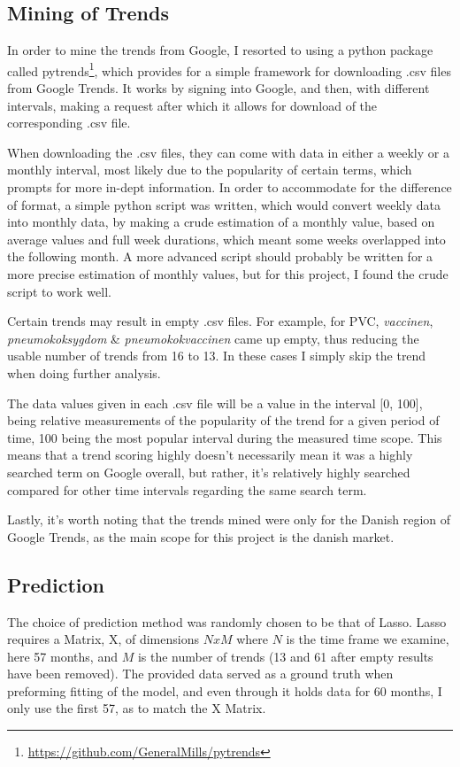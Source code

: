 \documentclass{sig-alternate}
\begin{document}
\subsection{Mining of Trends}
In order to mine the trends from Google, I resorted to using a python package called pytrends\footnote{\url{https://github.com/GeneralMills/pytrends}}, which provides for a simple framework for downloading .csv files from Google Trends. It works by signing into Google, and then, with different intervals, making a request after which it allows for download of the corresponding .csv file.

When downloading the .csv files, they can come with data in either a weekly or a monthly interval, most likely due to the popularity of certain terms, which prompts for more in-dept information. In order to accommodate for the difference of format, a simple python script was written, which would convert weekly data into monthly data, by making a crude estimation of a monthly value, based on average values and full week durations, which meant some weeks overlapped into the following month. A more advanced script should probably be written for a more precise estimation of monthly values, but for this project, I found the crude script to work well.

Certain trends may result in empty .csv files. For example, for PVC, \textit{vaccinen}, \textit{pneumokoksygdom} \& \textit{pneumokokvaccinen} came up empty, thus reducing the usable number of trends from 16 to 13. In these cases I simply skip the trend when doing further analysis.

The data values given in each .csv file will be a value in the interval [0, 100], being relative measurements of the popularity of the trend for a given period of time, 100 being the most popular interval during the measured time scope. This means that a trend scoring highly doesn't necessarily mean it was a highly searched term on Google overall, but rather, it's relatively highly searched compared for other time intervals regarding the same search term.

Lastly, it's worth noting that the trends mined  were only for the Danish region of Google Trends, as the main scope for this project is the danish market.

\subsection{Prediction}
The choice of prediction method was randomly chosen to be that of Lasso. Lasso requires a Matrix, X, of dimensions $NxM$ where $N$ is the time frame we examine, here 57 months, and $M$ is the number of trends (13 and 61 after empty results have been removed). The provided data served as a ground truth  when preforming fitting of the model, and even through it holds data for 60 months, I only use the first 57, as to match the X Matrix.
\end{document}
